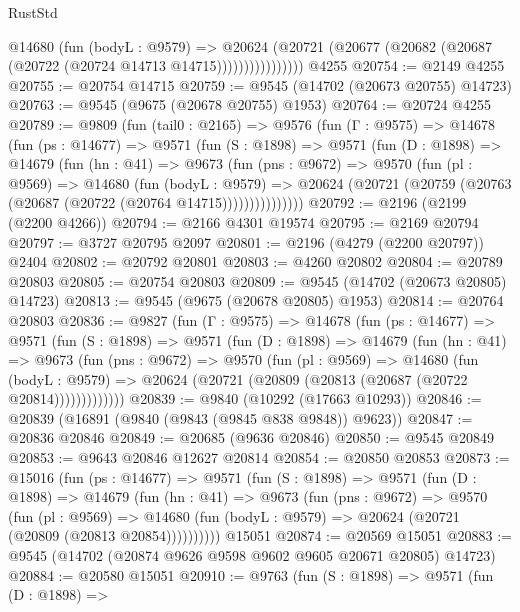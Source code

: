 \begin{lexlean}{RustStd}
\begin{coremodule}
                    @14680
                      (fun (bodyL : @9579) =>
                      @20624
                        (@20721
                          (@20677 (@20682 (@20687 (@20722 (@20724 @14713 @14715))))))))))))))))
    @4255
@20754 := @2149 @4255
@20755 := @20754 @14715
@20759 := @9545 (@14702 (@20673 @20755) @14723)
@20763 := @9545 (@9675 (@20678 @20755) @1953)
@20764 := @20724 @4255
@20789 := @9809
    (fun (tail0 : @2165) =>
    @9576
      (fun (Γ : @9575) =>
      @14678
        (fun (ps : @14677) =>
        @9571
          (fun (S : @1898) =>
          @9571
            (fun (D : @1898) =>
            @14679
              (fun (hn : @41) =>
              @9673
                (fun (pns : @9672) =>
                @9570
                  (fun (pl : @9569) =>
                  @14680
                    (fun (bodyL : @9579) =>
                    @20624 (@20721 (@20759 (@20763 (@20687 (@20722 (@20764 @14715)))))))))))))))
@20792 := @2196 (@2199 (@2200 @4266))
@20794 := @2166 @4301 @19574
@20795 := @2169 @20794
@20797 := @3727 @20795 @2097
@20801 := @2196 (@4279 (@2200 @20797)) @2404
@20802 := @20792 @20801
@20803 := @4260 @20802
@20804 := @20789 @20803
@20805 := @20754 @20803
@20809 := @9545 (@14702 (@20673 @20805) @14723)
@20813 := @9545 (@9675 (@20678 @20805) @1953)
@20814 := @20764 @20803
@20836 := @9827
    (fun (Γ : @9575) =>
    @14678
      (fun (ps : @14677) =>
      @9571
        (fun (S : @1898) =>
        @9571
          (fun (D : @1898) =>
          @14679
            (fun (hn : @41) =>
            @9673
              (fun (pns : @9672) =>
              @9570
                (fun (pl : @9569) =>
                @14680
                  (fun (bodyL : @9579) =>
                  @20624 (@20721 (@20809 (@20813 (@20687 (@20722 @20814)))))))))))))
@20839 := @9840 (@10292 (@17663 @10293))
@20846 := @20839 (@16891 (@9840 (@9843 (@9845 @838 @9848)) @9623))
@20847 := @20836 @20846
@20849 := @20685 (@9636 @20846)
@20850 := @9545 @20849
@20853 := @9643 @20846 @12627 @20814
@20854 := @20850 @20853
@20873 := @15016
    (fun (ps : @14677) =>
    @9571
      (fun (S : @1898) =>
      @9571
        (fun (D : @1898) =>
        @14679
          (fun (hn : @41) =>
          @9673
            (fun (pns : @9672) =>
            @9570
              (fun (pl : @9569) =>
              @14680 (fun (bodyL : @9579) => @20624 (@20721 (@20809 (@20813 @20854))))))))))
    @15051
@20874 := @20569 @15051
@20883 := @9545 (@14702 (@20874 @9626 @9598 @9602 @9605 @20671 @20805) @14723)
@20884 := @20580 @15051
@20910 := @9763
    (fun (S : @1898) =>
    @9571
      (fun (D : @1898) =>

\end{coremodule}
\end{lexlean}
